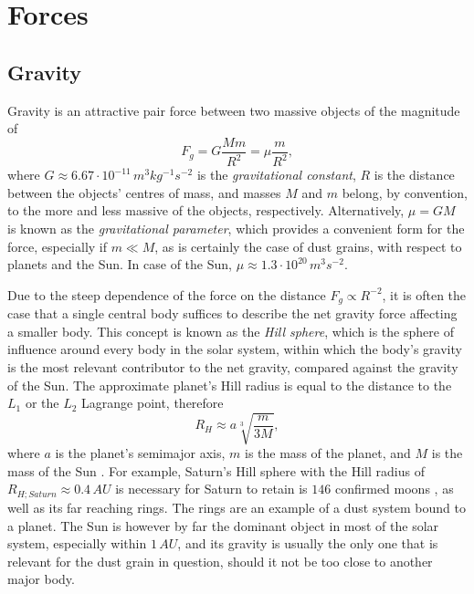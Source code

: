 \section{Forces} 

\subsection{Gravity} \label{ch:gravity}

Gravity is an attractive pair force between two massive objects of the magnitude of 
\begin{equation}
    F_g = G \frac{M m}{R^2} = \mu \frac{m}{R^2},
\end{equation}
where $G \approx 6.67 \cdot 10^{-11} \, m^3 kg^{-1} s^{-2}$ is the \textit{gravitational constant}, $R$ is the distance between the objects' centres of mass, and masses $M$ and $m$ belong, by convention, to the more and less massive of the objects, respectively. Alternatively, $\mu = G M$ is known as the \textit{gravitational parameter}, which provides a convenient form for the force, especially if $m \ll M$, as is certainly the case of dust grains, with respect to planets and the Sun. In case of the Sun, $\mu \approx 1.3 \cdot 10^{20} \, \si{m^3 s^{-2}}$.

Due to the steep dependence of the force on the distance $F_g \propto R^{-2}$, it is often the case that a single central body suffices to describe the net gravity force affecting a smaller body. This concept is known as the \textit{Hill sphere}, which is the sphere of influence around every body in the solar system, within which the body's gravity is the most relevant contributor to the net gravity, compared against the gravity of the Sun. The approximate planet's Hill radius is equal to the distance to the $L_1$ or the $L_2$ Lagrange point, therefore 
\begin{equation}
    R_H \approx a \sqrt[3]{\frac{m}{3M}},
\end{equation}
where $a$ is the planet's semimajor axis, $m$ is the mass of the planet, and $M$ is the mass of the Sun \citep{sheppard2023new}. For example, Saturn's Hill sphere with the Hill radius of $R_{H;Saturn} \approx 0.4 \, \si{AU}$ is necessary for Saturn to retain is $146$ confirmed moons \citep{sheppard2023new}, as well as its far reaching rings. The rings are an example of a dust system bound to a planet. The Sun is however by far the dominant object in most of the solar system, especially within $1 \, \si{AU}$, and its gravity is usually the only one that is relevant for the dust grain in question, should it not be too close to another major body.

